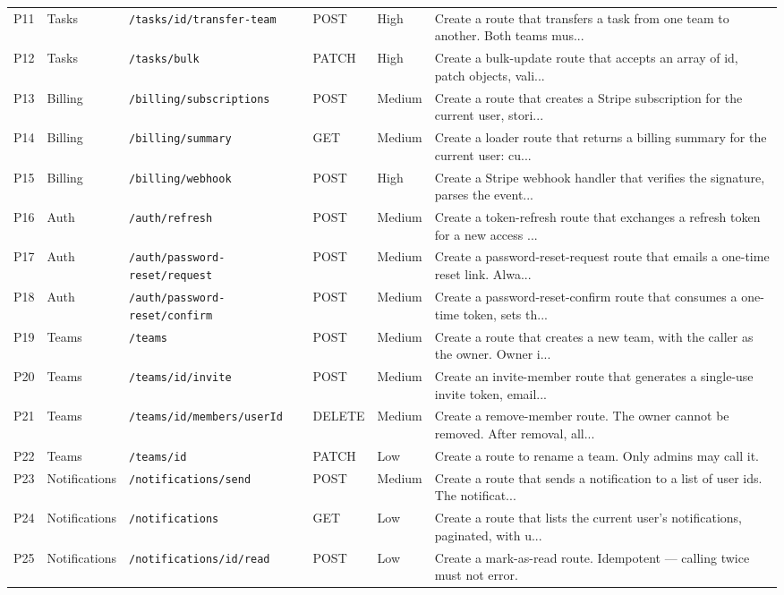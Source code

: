 \begin{table}[htbp]
{\begin{tabular}{llllll}
P11 & Tasks & \texttt{/tasks/\:id/transfer-team} & POST & High & Create a route that transfers a task from one team to another. Both teams mus... \\
P12 & Tasks & \texttt{/tasks/bulk} & PATCH & High & Create a bulk-update route that accepts an array of {id, patch} objects, vali... \\
P13 & Billing & \texttt{/billing/subscriptions} & POST & Medium & Create a route that creates a Stripe subscription for the current user, stori... \\
P14 & Billing & \texttt{/billing/summary} & GET & Medium & Create a loader route that returns a billing summary for the current user: cu... \\
P15 & Billing & \texttt{/billing/webhook} & POST & High & Create a Stripe webhook handler that verifies the signature, parses the event... \\
P16 & Auth & \texttt{/auth/refresh} & POST & Medium & Create a token-refresh route that exchanges a refresh token for a new access ... \\
P17 & Auth & \texttt{/auth/password-reset/request} & POST & Medium & Create a password-reset-request route that emails a one-time reset link. Alwa... \\
P18 & Auth & \texttt{/auth/password-reset/confirm} & POST & Medium & Create a password-reset-confirm route that consumes a one-time token, sets th... \\
P19 & Teams & \texttt{/teams} & POST & Medium & Create a route that creates a new team, with the caller as the owner. Owner i... \\
P20 & Teams & \texttt{/teams/\:id/invite} & POST & Medium & Create an invite-member route that generates a single-use invite token, email... \\
P21 & Teams & \texttt{/teams/\:id/members/\:userId} & DELETE & Medium & Create a remove-member route. The owner cannot be removed. After removal, all... \\
P22 & Teams & \texttt{/teams/\:id} & PATCH & Low & Create a route to rename a team. Only admins may call it. \\
P23 & Notifications & \texttt{/notifications/send} & POST & Medium & Create a route that sends a notification to a list of user ids. The notificat... \\
P24 & Notifications & \texttt{/notifications} & GET & Low & Create a route that lists the current user's notifications, paginated, with u... \\
P25 & Notifications & \texttt{/notifications/\:id/read} & POST & Low & Create a mark-as-read route. Idempotent --- calling twice must not error. \\

\end{tabular}}
\end{table}

